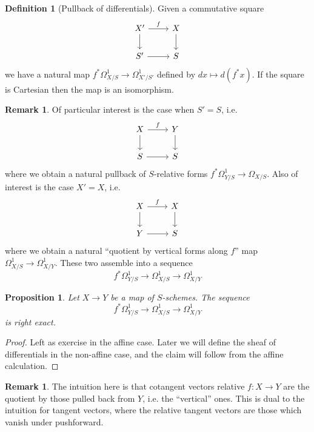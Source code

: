 \documentclass[10pt]{article}
\newtheorem{prop}[thm]{Proposition}
\theoremstyle{definition}
\newtheorem{defn}[thm]{Definition}
\newtheorem{rmk}[thm]{Remark}
\begin{document}
\begin{defn}[Pullback of differentials]
Given a commutative square
$$\begin{tikzcd}
X' \arrow[r, "f"] \arrow[d] & X \arrow[d] \\
S' \arrow[r] & S
\end{tikzcd}$$
we have a natural map $f^* \Omega^1_{X/S} \rightarrow \Omega^1_{X'/S'}$ defined by $dx \mapsto d(f^*x)$.  If the square is Cartesian then the map is an isomorphism.
\end{defn}


\begin{rmk}
Of particular interest is the case when $S' = S$, i.e.
$$\begin{tikzcd}
X \arrow[r, "f"] \arrow[d] & Y \arrow[d] \\
S \arrow[r] & S
\end{tikzcd}$$
where we obtain a natural pullback of $S$-relative forms $f^* \Omega^1_{Y/S} \rightarrow \Omega_{X/S}$.  Also of interest is the case $X'=X$, i.e.
$$\begin{tikzcd}
X \arrow[r, "f"] \arrow[d] & X \arrow[d] \\
Y \arrow[r] & S
\end{tikzcd}$$
where we obtain a natural ``quotient by vertical forms along $f$'' map $\Omega^1_{X/S} \rightarrow \Omega^1_{X/Y}$.  These two assemble into a sequence
$$f^* \Omega^1_{Y/S} \rightarrow \Omega^1_{X/S} \rightarrow \Omega^1_{X/Y}$$
\end{rmk}




\begin{prop}
Let $X \rightarrow Y$ be a map of $S$-schemes.  The sequence
$$f^* \Omega^1_{Y/S} \rightarrow \Omega^1_{X/S} \rightarrow \Omega^1_{X/Y}$$
is right exact.%
\end{prop}
\begin{proof}
Left as exercise in the affine case.  Later we will define the sheaf of differentials in the non-affine case, and the claim will follow from the affine calculation.
\end{proof}


\begin{rmk}
The intuition here is that cotangent vectors relative $f: X \rightarrow Y$ are the quotient by those pulled back from $Y$, i.e. the ``vertical'' ones.  This is dual to the intuition for tangent vectors, where the relative tangent vectors are those which vanish under pushforward.
\end{rmk}
\end{document}
